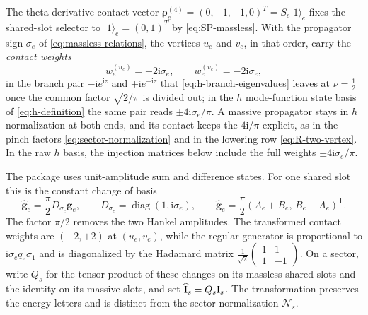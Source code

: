 \documentclass[11pt,a4paper]{article}
\numberwithin{table}{section}
\newcommand{\ii}{\mathrm i}
\newcommand{\diag}{\operatorname{diag}}
\newcommand{\cN}{\mathcal N}
\begin{document}
The theta-derivative contact vector $\bm\rho_e^{(4)}=(0,-1,+1,0)^T=S_e|1\rangle_e$
fixes the shared-slot selector to $|1\rangle_e=(0,1)^T$ by \eqref{eq:SP-massless}.
With the propagator sign $\sigma_e$ of \eqref{eq:massless-relations}, the vertices
$u_e$ and $v_e$, in that order, carry the \emph{contact weights}
\begin{equation}
  w_{e}^{(u_e)}=+2\ii\sigma_e,\qquad w_{e}^{(v_e)}=-2\ii\sigma_e,
  \label{eq:contact-weight}
\end{equation}
in the branch pair $-\ii e^{\ii z}$ and $+\ii e^{-\ii z}$ that \eqref{eq:h-branch-eigenvalues} leaves
at $\nu=\tfrac12$ once the common factor $\sqrt{2/\pi}$ is divided out; in the $h$ mode-function
state basis of \eqref{eq:h-definition} the same pair reads $\pm4\ii\sigma_e/\pi$. A massive
propagator stays in $h$ normalization at both ends, and its contact keeps the $4\ii/\pi$ explicit, as
in the pinch factors \eqref{eq:sector-normalization} and in the lowering row
\eqref{eq:R-two-vertex}. In the raw $h$ basis, the injection matrices below include the
full weights $\pm4\ii\sigma_e/\pi$.

The package uses unit-amplitude sum and difference states. For one shared slot this is the
constant change of basis
\begin{equation}
  \widehat{\bm g}_e=\frac{\pi}{2}D_{\sigma_e}\bm g_e,
  \qquad D_{\sigma_e}=\diag(1,\ii\sigma_e),
  \qquad
  \widehat{\bm g}_e=\frac{\pi}{2}(A_e+B_e,\,B_e-A_e)^{\mathsf T}.
  \label{eq:package-massless-basis}
\end{equation}
The factor $\pi/2$ removes the two Hankel amplitudes. The transformed contact weights are
$(-2,+2)$ at $(u_e,v_e)$, while the regular generator is proportional to
$\ii\sigma_e q_e\sigma_1$ and is diagonalized by the Hadamard matrix
$\tfrac1{\sqrt2}\left(\begin{smallmatrix}1&1\\1&-1\end{smallmatrix}\right)$.
On a sector, write $Q_s$ for the tensor product of these changes on its massless shared
slots and the identity on its massive slots, and set
$\widehat{\bm{\text I}}_s=Q_s\bm{\text I}_s$. The transformation preserves the energy letters
and is distinct from the sector normalization $\cN_s$.
\end{document}
